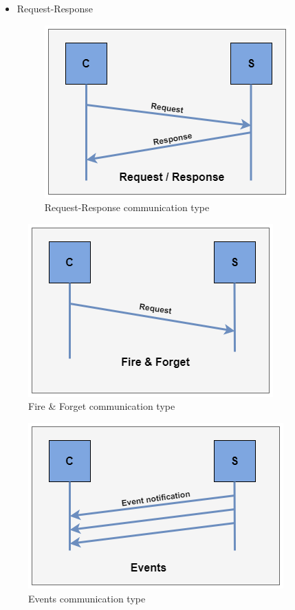 \begin{itemize}
	\item Request-Response
	\begin{figure}[!htb]
	\centering
		\includegraphics{images/Request-response.png}
	\caption{Request-Response communication type}
	\label{fig:Request-response}
\end{figure}
\end{itemize}


\begin{figure}[!htb]
	\centering
		\includegraphics{images/fire-forget.png}
	\caption{Fire \& Forget communication type}
	\label{fig:fire-forget}
\end{figure}

\begin{figure}[!htb]
	\centering
		\includegraphics{images/Events.png}
	\caption{Events communication type}
	\label{fig:Events}
\end{figure}

